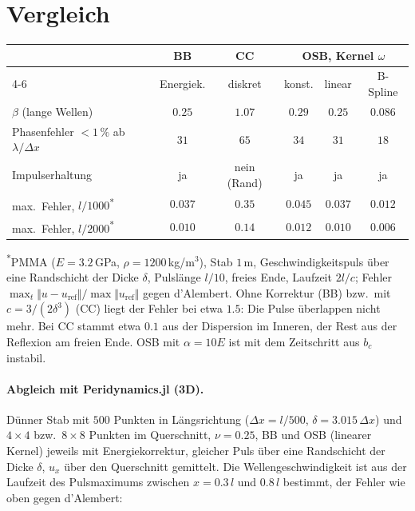 \documentclass[a4paper,11pt]{article}
\begin{document}
\section*{Vergleich}
\begin{center}
\small
\begin{tabular}{@{}lccccc@{}}
  \toprule
  & BB & CC & \multicolumn{3}{c}{OSB, Kernel $\omega$} \\
  \cmidrule(l){4-6}
  & Energiek. & diskret & konst. & linear & B-Spline \\
  \midrule
  $\beta$ (lange Wellen)          & $0.25$  & $1.07$ & $0.29$ & $0.25$ & $0.086$ \\
  Phasenfehler $<1\,\%$ ab $\lambda/\Delta x$ & $31$ & $65$ & $34$ & $31$ & $18$ \\
  Impulserhaltung                 & ja      & nein (Rand) & ja & ja & ja \\
  max.\ Fehler, $l/1000$\textsuperscript{*} & $0.037$ & $0.35$ & $0.045$ & $0.037$ & $0.012$ \\
  max.\ Fehler, $l/2000$\textsuperscript{*} & $0.010$ & $0.14$ & $0.012$ & $0.010$ & $0.006$ \\
  \bottomrule
\end{tabular}
\end{center}
{\footnotesize\textsuperscript{*}PMMA ($E = 3.2$\,GPa, $\rho = 1200$\,kg/m$^3$), Stab $1$\,m, Geschwindigkeitspuls über eine
Randschicht der Dicke $\delta$, Pulslänge $l/10$, freies Ende, Laufzeit $2l/c$;
Fehler $\max_t \Vert u-u_\mathrm{ref}\Vert/\max\Vert u_\mathrm{ref}\Vert$ gegen d'Alembert.
Ohne Korrektur (BB) bzw.\ mit $c = 3/(2\delta^3)$ (CC) liegt der Fehler bei etwa $1.5$: Die Pulse überlappen nicht mehr.
Bei CC stammt etwa $0.1$ aus der Dispersion im Inneren, der Rest aus der Reflexion am freien Ende.
OSB mit $\alpha = 10E$ ist mit dem Zeitschritt aus $b_c$ instabil.}

\paragraph{Abgleich mit Peridynamics.jl (3D).} Dünner Stab mit $500$ Punkten in Längsrichtung
($\Delta x = l/500$, $\delta = 3.015\,\Delta x$) und $4\times4$ bzw.\ $8\times8$ Punkten im Querschnitt, $\nu = 0.25$,
BB und OSB (linearer Kernel) jeweils mit Energiekorrektur, gleicher Puls über eine Randschicht der Dicke $\delta$,
$u_x$ über den Querschnitt gemittelt. Die Wellengeschwindigkeit ist aus der Laufzeit des Pulsmaximums zwischen
$x = 0.3\,l$ und $0.8\,l$ bestimmt, der Fehler wie oben gegen d'Alembert:
\end{document}
